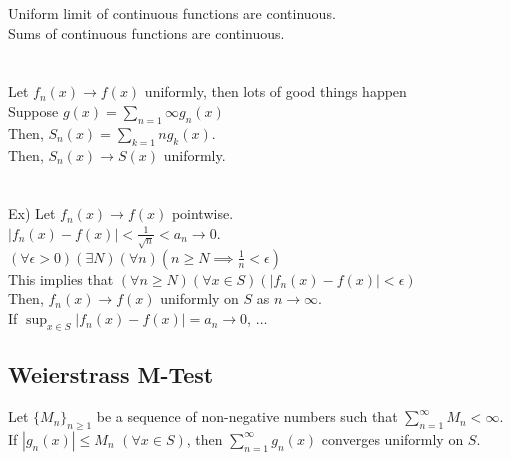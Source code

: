 \documentclass[11pt]{article}
\begin{document}
	Uniform limit of continuous functions are continuous.\\
	Sums of continuous functions are continuous.\\\\\\
	Let $f_n(x) \to f(x)$ uniformly, then lots of good things happen\\
	Suppose $g(x) =\sum_{n = 1}{\infty}{g_n(x)}$\\
	Then, $S_n(x) = \sum_{k = 1}{n}{g_k(x)}$.\\
	Then, $S_n(x) \to S(x)$ uniformly.\\\\\\
	Ex) Let $f_n(x) \to f(x)$ pointwise.\\
	$|f_n(x) - f(x)| < \frac{1}{\sqrt{n}} < a_n \to 0$.\\
	$(\forall \epsilon > 0 )(\exists N)(\forall n)
	(n \ge N \implies \frac{1}{n} < \epsilon)$\\
	This implies that $(\forall n \ge N)(\forall x \in S)
	(|f_n(x) - f(x)| < \epsilon)$\\
	Then, $f_n(x) \to f(x)$ uniformly on $S$ as $n \to \infty$.\\
	If $\sup_{x \in S}|f_n(x) - f(x)| = a_n \to 0$, $\ldots$

	\subsection*{Weierstrass M-Test}
		Let $\{M_n\}_{n \ge 1}$ be a sequence of non-negative numbers such that
		$\sum_{n = 1}^{\infty} M_n < \infty$. If $|g_n(x)| \le M_n$ $(\forall x 
		\in S)$, then $\sum_{n = 1}^{\infty} g_n(x)$ converges uniformly on 
		$S$.\\\\
\end{document}
